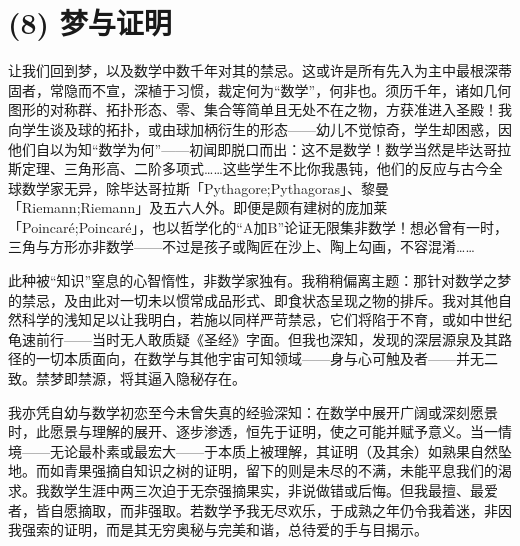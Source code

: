 \section{(8) 梦与证明}

让我们回到梦，以及数学中数千年对其的禁忌。这或许是所有先入为主中最根深蒂固者，常隐而不宣，深植于习惯，裁定何为“数学”，何非也。须历千年，诸如几何图形的对称群、拓扑形态、零、集合等简单且无处不在之物，方获准进入圣殿！我向学生谈及球的拓扑，或由球加柄衍生的形态——幼儿不觉惊奇，学生却困惑，因他们自以为知“数学为何”——初闻即脱口而出：这不是数学！数学当然是毕达哥拉斯定理、三角形高、二阶多项式……这些学生不比你我愚钝，他们的反应与古今全球数学家无异，除毕达哥拉斯「Pythagore;Pythagoras」、黎曼「Riemann;Riemann」及五六人外。即便是颇有建树的庞加莱「Poincaré;Poincaré」，也以哲学化的“A加B”论证无限集非数学！想必曾有一时，三角与方形亦非数学——不过是孩子或陶匠在沙上、陶上勾画，不容混淆……

此种被“知识”窒息的心智惰性，非数学家独有。我稍稍偏离主题：那针对数学之梦的禁忌，及由此对一切未以惯常成品形式、即食状态呈现之物的排斥。我对其他自然科学的浅知足以让我明白，若施以同样严苛禁忌，它们将陷于不育，或如中世纪龟速前行——当时无人敢质疑《圣经》字面。但我也深知，发现的深层源泉及其路径的一切本质面向，在数学与其他宇宙可知领域——身与心可触及者——并无二致。禁梦即禁源，将其逼入隐秘存在。

我亦凭自幼与数学初恋至今未曾失真的经验深知：在数学中展开广阔或深刻愿景时，此愿景与理解的展开、逐步渗透，恒先于证明，使之可能并赋予意义。当一情境——无论最朴素或最宏大——于本质上被理解，其证明（及其余）如熟果自然坠地。而如青果强摘自知识之树的证明，留下的则是未尽的不满，未能平息我们的渴求。我数学生涯中两三次迫于无奈强摘果实，非说做错或后悔。但我最擅、最爱者，皆自愿摘取，而非强取。若数学予我无尽欢乐，于成熟之年仍令我着迷，非因我强索的证明，而是其无穷奥秘与完美和谐，总待爱的手与目揭示。